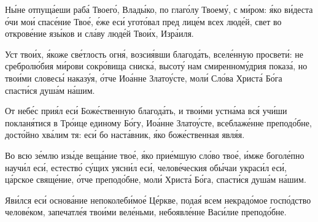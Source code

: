 \begin{mymulticols}
Н\'{ы}не отпущ\'{а}еши раб\'{а} Твоег\'{о}, Влад\'{ы}ко, по глаг\'{о}лу Твоем\'{у}, с м\'{и}ром: \'{я}ко в\'{и}деста \'{о}чи мо\'{и} спас\'{е}ние Тво\'{е}, \'{е}же ес\'{и} угот\'{о}вал пред лиц\'{е}м всех люд\'{е}й, свет во откров\'{е}ние яз\'{ы}ков и сл\'{а}ву люд\'{е}й Тво\'{и}х, Изр\'{а}иля.

\TrisviatoePoOtcheNash


Уст тво\'{и}х, \'{я}коже св\'{е}тлость огн\'{я}, возси\'{я}вши благод\'{а}ть, всел\'{е}нную просвет\'{и}: не среброл\'{ю}бия м\'{и}рови сокр\'{о}вища сниск\'{а}, высот\'{у} нам смиренном\'{у}дрия показ\'{а}, но тво\'{и}ми словес\'{ы} наказ\'{у}я, \'{о}тче Ио\'{а}нне Злато\'{у}сте, мол\'{и} Сл\'{о}ва Христ\'{а} Б\'{о}га спаст\'{и}ся душ\'{а}м н\'{а}шим.


\slava

От неб\'{е}с при\'{я}л ес\'{и} Бож\'{е}ственную благод\'{а}ть, и тво\'{и}ми устн\'{а}ма вс\'{я} уч\'{и}ши поклан\'{я}тися в Тр\'{о}ице единому Б\'{о}гу, Ио\'{а}нне Злато\'{у}сте, всеблаж\'{е}нне препод\'{о}бне, дост\'{о}йно хв\'{а}лим тя: ес\'{и} бо наст\'{а}вник, \'{я}ко бож\'{е}ственная явл\'{я}я.

\inyne

\Bogorodichen{\Predstatelstvo}



Во всю з\'{е}млю из\'{ы}де вещ\'{а}ние тво\'{е}, \'{я}ко при\'{е}мшую сл\'{о}во тво\'{е}, \'{и}мже богол\'{е}пно науч\'{и}л ес\'{и}, естеств\'{о} с\'{у}щих уясн\'{и}л ес\'{и}, челов\'{е}ческия об\'{ы}чаи украс\'{и}л ес\'{и}, ц\'{а}рское свящ\'{е}ние, \'{о}тче препод\'{о}бне, мол\'{и} Христ\'{а} Б\'{о}га, спаст\'{и}ся душ\'{а}м н\'{а}шим.

\vspace{-\baselineskip}

\slava

Яв\'{и}лся ес\'{и} основ\'{а}ние непоколеб\'{и}мо\'{е} Ц\'{е}ркве, пода\'{я} всем некрад\'{о}мое госп\'{о}дство челов\'{е}ком, запечатл\'{е}я тво\'{и}ми вел\'{е}ньми, небоявл\'{е}нне Вас\'{и}лие препод\'{о}бне.

\inyne

\Bogorodichen{\Predstatelstvo}


\end{mymulticols}
